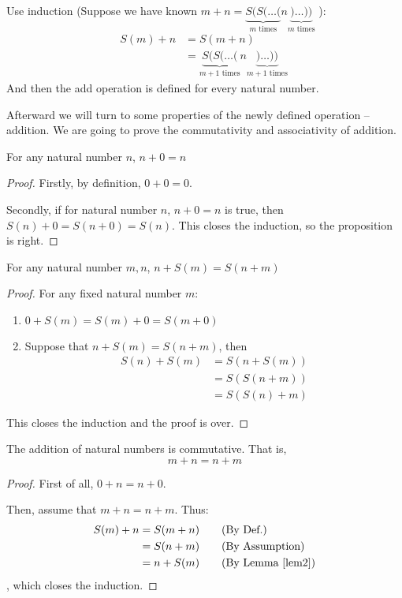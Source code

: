 Use induction (Suppose we have known 
$m+n=\underbrace{S(S(\dots(}_{m \text{ times}}n\underbrace{)\dots))}_{m \text{ times}}$ ):
\begin{align*}
S(m)+n
&= S(m+n)\ \tag{By the second rule} \\
&=\underbrace{S(S(\dots(}_{m+1 \text{ times}}n\underbrace{)\dots))}_{m+1 \text{ times}}\ 
\tag{By the result of \(m+n\)}
\end{align*}
And then the add operation is defined for every natural number.

Afterward we will turn to some properties of the newly defined operation -- addition. We are going to 
prove the commutativity and associativity of addition.

\begin{lem}
For any natural number $n$, $n+0=n$
\end{lem}
\begin{proof}
Firstly, by definition, $0 + 0 = 0$.

Secondly, if for natural number $n$, $n+0=n$ is true, then $S(n)+0=S(n+0)=S(n)$. This closes the 
induction, so the proposition is right. \qedhere
\end{proof}

\begin{lem}
For any natural number $m,n$, $n+S(m)=S(n+m)$ \label{lem2}
\end{lem}
\begin{proof}
For any fixed natural number $m$:
\begin{enumerate}
\item $0+S(m)=S(m)+0=S(m+0)$
\item Suppose that $n+S(m)=S(n+m)$, then 
\begin{align*}
S(n) + S(m) 
&= S(n+S(m)) \tag{By Def.} \\
&= S(S(n+m)) \tag{By assumption} \\
&= S(S(n)+m) \tag{By Def.}
\end{align*}
\end{enumerate} 
This closes the induction and the proof is over. \qedhere
\end{proof}

\begin{prop}
The addition of natural numbers is commutative. That is,
\[
m + n = n + m
\]
\end{prop}
\begin{proof}
First of all, $0+n=n+0$.

Then, assume that $m+n=n+m$. Thus:
\begin{align*}
S(m)+n
&= S(m+n) \tag{By Def.}\\
&= S(n+m) \tag{By Assumption}\\
&= n+S(m) \tag{By Lemma \ref{lem2}}
\end{align*}, which closes the induction. \qedhere
\end{proof}

